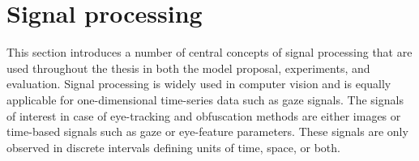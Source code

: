 






\section{Signal processing}
This section introduces a number of central concepts of signal processing that are used throughout the thesis in both the model proposal, experiments, and evaluation. Signal processing is widely used in computer vision and is equally applicable for one-dimensional time-series data such as gaze signals. The signals of interest in case of eye-tracking and obfuscation methods are either images or time-based signals such as gaze or eye-feature parameters. These signals are only observed in discrete intervals defining units of time, space, or both. 

